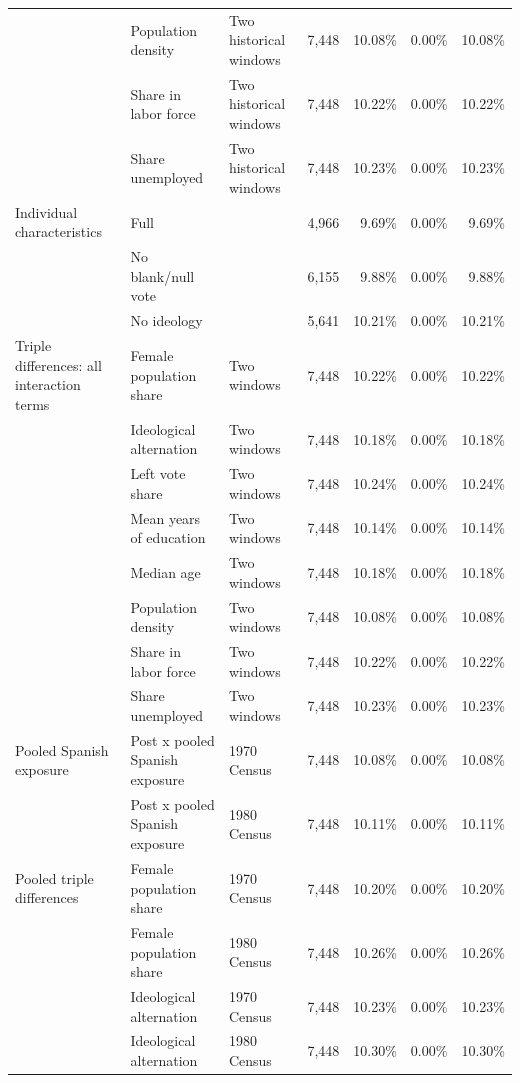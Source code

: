 \begin{longtable}{p{}p{}p{}rrrr}
 & Population density & Two historical windows &        7,448 & 10.08\% &  0.00\% & 10.08\% \\
 & Share in labor force & Two historical windows &        7,448 & 10.22\% &  0.00\% & 10.22\% \\
 & Share unemployed & Two historical windows &        7,448 & 10.23\% &  0.00\% & 10.23\% \\
\addlinespace
Individual characteristics & Full &  &        4,966 &  9.69\% &  0.00\% &  9.69\% \\
 & No blank/null vote &  &        6,155 &  9.88\% &  0.00\% &  9.88\% \\
 & No ideology &  &        5,641 & 10.21\% &  0.00\% & 10.21\% \\
\addlinespace
Triple differences: all interaction terms & Female population share & Two windows &        7,448 & 10.22\% &  0.00\% & 10.22\% \\
 & Ideological alternation & Two windows &        7,448 & 10.18\% &  0.00\% & 10.18\% \\
 & Left vote share & Two windows &        7,448 & 10.24\% &  0.00\% & 10.24\% \\
 & Mean years of education & Two windows &        7,448 & 10.14\% &  0.00\% & 10.14\% \\
 & Median age & Two windows &        7,448 & 10.18\% &  0.00\% & 10.18\% \\
 & Population density & Two windows &        7,448 & 10.08\% &  0.00\% & 10.08\% \\
 & Share in labor force & Two windows &        7,448 & 10.22\% &  0.00\% & 10.22\% \\
 & Share unemployed & Two windows &        7,448 & 10.23\% &  0.00\% & 10.23\% \\
\addlinespace
Pooled Spanish exposure & Post x pooled Spanish exposure & 1970 Census &        7,448 & 10.08\% &  0.00\% & 10.08\% \\
 & Post x pooled Spanish exposure & 1980 Census &        7,448 & 10.11\% &  0.00\% & 10.11\% \\
\addlinespace
Pooled triple differences & Female population share & 1970 Census &        7,448 & 10.20\% &  0.00\% & 10.20\% \\
 & Female population share & 1980 Census &        7,448 & 10.26\% &  0.00\% & 10.26\% \\
 & Ideological alternation & 1970 Census &        7,448 & 10.23\% &  0.00\% & 10.23\% \\
 & Ideological alternation & 1980 Census &        7,448 & 10.30\% &  0.00\% & 10.30\% \\

\end{longtable}
